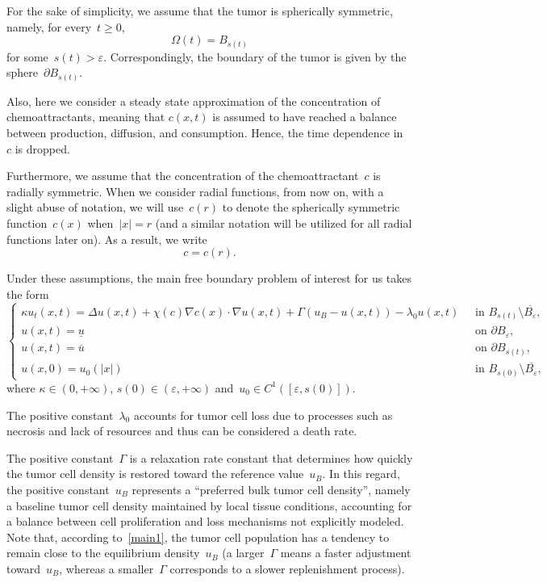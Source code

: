 \documentclass[12pt,a4paper,intlimits,sumlimits]{amsart}
\theoremstyle{definition}
\theoremstyle{plain}
\numberwithin{equation}{section}
\renewcommand{\ge}{\geqslant}
\begin{document}
For the sake of simplicity, we assume that the tumor is spherically symmetric, namely, for every~$t\ge0$,
\begin{equation}\label{Omegapalla}
\Omega(t)=B_{s(t)}
\end{equation}
for some~$s(t)>\varepsilon$.
Correspondingly,
the boundary of the tumor is given by the sphere~$\partial B_{s(t)}$.

Also, here we consider a steady state approximation of the concentration of chemoattractants, meaning that $c(x, t)$ is assumed to have reached a balance between production, diffusion, and consumption.  Hence, the time dependence in~$c$ is dropped.

Furthermore, we assume that the concentration of the chemoattractant~$c$ is radially symmetric. When we consider radial functions,
from now on, with a slight abuse of notation, we will use~$c(r)$
to denote the spherically symmetric
function~$c(x)$ when~$|x|=r$ (and a similar notation
will be utilized for all radial functions later on).
As a result, we write
\begin{equation}\label{c-radiale}
c=c(r).
\end{equation}

Under these assumptions, the main free boundary problem of interest for us takes the form
\begin{equation}\label{main1}
\begin{cases}
\kappa u_t(x,t) = \Delta u(x, t) +\chi(c) \nabla c(x)\cdot\nabla u(x, t) + \Gamma(u_B - u(x, t)) -\lambda_0 u(x, t) &\;\mbox{ in } B_{s(t)}\setminus\overline{B_{\varepsilon}},\\
u(x, t) = \underline{u} &\;\mbox{ on } \partial B_{\varepsilon}, \\
u(x, t) = \overline{u} &\;\mbox{ on } \partial B_{s(t)}, \\
u(x, 0) = u_0(|x|) &\;\mbox{ in } B_{s(0)}\setminus\overline{B_{\varepsilon}},
\end{cases}
\end{equation}
where $\kappa\in(0,+\infty)$, $s(0)\in(\varepsilon,+\infty)$ and~$u_0
\in C^1([\varepsilon,s(0)])$. 

The positive constant~$\lambda_0$ accounts for tumor cell loss due to processes such as
necrosis and
lack of resources and thus can be considered a death rate.

The positive constant~$\Gamma$ is a relaxation rate constant
that determines how quickly the tumor cell density is restored toward the reference value~$u_B$.
In this regard,
the positive constant~$u_B$ represents a ``preferred bulk tumor cell density'', namely a
baseline tumor cell density maintained by local tissue conditions, accounting for a balance between cell proliferation and loss mechanisms not explicitly modeled.
Note that, according to~\eqref{main1},
the tumor cell population has a tendency to remain close to the equilibrium density~$u_B$
(a larger~$\Gamma$ means a faster adjustment toward~$u_B$,
whereas a smaller~$\Gamma$ corresponds to a slower replenishment process).
\end{document}
